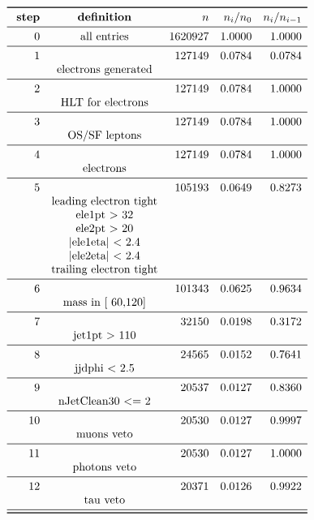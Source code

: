 \documentclass[11pt,a4paper]{article}
\begin{document}
\begin{table}
\caption{\emph{Entries after each selection step, normalised to 5.00 $fb^{-1}$; n is the number of entries after the i-th selection step; Note that cuts on second jet are applied only if a second jet exists with $p_t$ > 30\,GeV.}}
\[
\begin{array}{rcrrr}
\toprule
\ \textbf{step}& \textbf{definition}  & n  &  n_i/n_0 & n_i/n_{i-1}  \\ 
\midrule
 0  & \text{all entries} & 1620927 & 1.0000 & 1.0000 \\
\midrule
 1  & & 127149 & 0.0784 & 0.0784 \\
& \text{electrons generated} & & & \\
\midrule
 2  & & 127149 & 0.0784 & 1.0000 \\
& \text{HLT for electrons} & & & \\
\midrule
 3  & & 127149 & 0.0784 & 1.0000 \\
& \text{OS/SF leptons} & & & \\
\midrule
 4  & & 127149 & 0.0784 & 1.0000 \\
& \text{electrons} & & & \\
\midrule
 5  & & 105193 & 0.0649 & 0.8273 \\
& \text{leading electron tight} & & & \\
& \text{ele1pt >  32} & & & \\
& \text{ele2pt >  20} & & & \\
& \text{|ele1eta| < 2.4} & & & \\
& \text{|ele2eta| < 2.4} & & & \\
& \text{trailing electron tight} & & & \\
\midrule
 6  & & 101343 & 0.0625 & 0.9634 \\
& \text{mass in [ 60,120]} & & & \\
\midrule
 7  & &  32150 & 0.0198 & 0.3172 \\
& \text{jet1pt >  110} & & & \\
\midrule
 8  & &  24565 & 0.0152 & 0.7641 \\
& \text{jjdphi < 2.5} & & & \\
\midrule
 9  & &  20537 & 0.0127 & 0.8360 \\
& \text{nJetClean30 <= 2} & & & \\
\midrule
 10  & &  20530 & 0.0127 & 0.9997 \\
& \text{muons veto} & & & \\
\midrule
 11  & &  20530 & 0.0127 & 1.0000 \\
& \text{photons veto} & & & \\
\midrule
 12  & &  20371 & 0.0126 & 0.9922 \\
& \text{tau veto} & & & \\
\midrule
\bottomrule
\end{array}
\]
\end{table}
\end{document}
